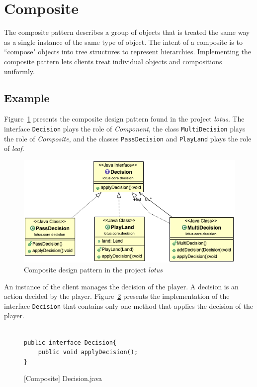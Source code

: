 \section{Composite}

The composite pattern describes a group of objects that is treated the same way as a single instance of the same type of object. The intent of a composite is to ``compose" objects into tree structures to represent hierarchies. Implementing the composite pattern lets clients treat individual objects and compositions uniformly.

\subsection*{Example}

Figure~\ref{fig:composite} presents the composite design pattern found in the project \textit{lotus}. The interface \texttt{Decision} plays the role of \textit{Component}, the class \texttt{MultiDecision} plays the role of \textit{Composite}, and the classes \texttt{PassDecision} and \texttt{PlayLand} plays the role of \textit{leaf}.

\begin{figure}[htb]
    \centering
    \includegraphics[width=0.8\columnwidth]{images/composite.png}
    \caption{Composite design pattern in the project \textit{lotus}}
    \label{fig:composite}
\end{figure}
\FloatBarrier


An instance of the client manages the decision of the player. A decision is an action decided by the player. Figure~\ref{fig:Decision} presents the implementation of the interface \texttt{Decision} that contains only one method that applies the decision of the player.

\begin{figure}[!tbp]
\centering
\lstset{language=Java,  basicstyle=\scriptsize, stepnumber=1, showspaces=false, showstringspaces=false,breaklines=true}
\begin{lstlisting}

public interface Decision{
	public void applyDecision();
}

\end{lstlisting}
\caption{[Composite] Decision.java}
\label{fig:Decision}
\end{figure}
\FloatBarrier

